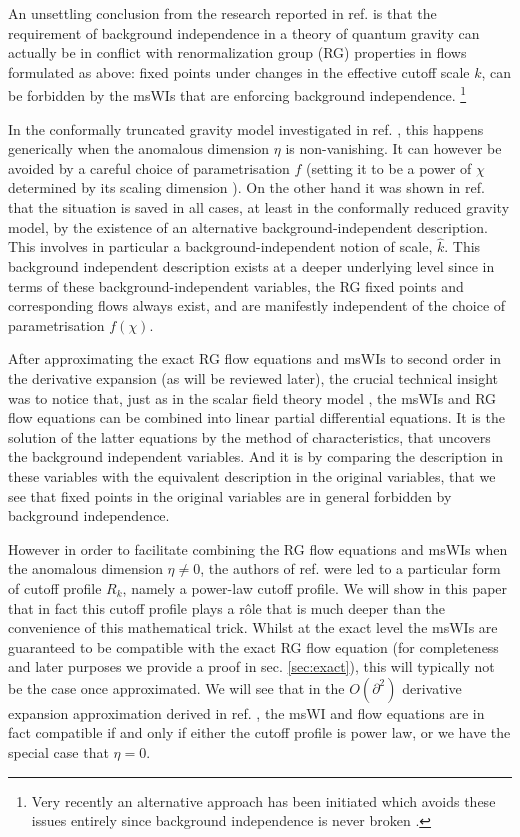 \documentclass[11pt]{book} %
\numberwithin{equation}{chapter}
\begin{document}
An unsettling conclusion from the research reported in ref. \cite{Dietz:2015owa} is that the
requirement of background independence in a theory of quantum gravity can actually be
in conflict with renormalization group (RG) properties in flows formulated as above:
fixed points under changes in the effective cutoff scale $k$, can be forbidden by the msWIs
that are enforcing background independence.%
\footnote{Very recently an alternative approach has been initiated which avoids
these issues entirely since background independence is never broken \cite{Morris:2016nda}.}

In the conformally truncated gravity model investigated in ref. \cite{Dietz:2015owa},
this happens generically when the anomalous dimension $\eta$ is non-vanishing.
It can however be avoided by a careful choice of parametrisation $f$
(setting it to be a power of $\chi$ determined by its scaling dimension \cite{Dietz:2015owa}).
On the other hand it was shown in ref. \cite{Dietz:2015owa} that the situation is saved in all cases,
at least in the conformally reduced gravity model,
by the existence of an alternative background-independent description.
This involves in particular a background-independent notion of scale, $\hat{k}$.
This background independent description exists at a deeper underlying level since in terms
of these background-independent variables, the RG fixed points and corresponding flows always exist,
and are manifestly independent of the choice of parametrisation $f(\chi)$.

After approximating the exact RG flow equations and msWIs to second order in the derivative
expansion (as will be reviewed later),
the crucial technical insight was to notice that, just as in the scalar field theory model
\cite{Bridle:2013sra}, the msWIs and RG flow equations can be combined into linear partial
differential equations. It is the solution of the latter equations by the method of characteristics,
that uncovers the background independent variables.
And it is by comparing the description in these variables with the equivalent description
in the original variables, that we see that fixed points in the original variables are
in general forbidden by  background independence.

However in order to facilitate combining the RG flow equations and msWIs when the anomalous
dimension $\eta\ne0$, the authors of ref. \cite{Dietz:2015owa} were led to a particular form
of cutoff profile $R_k$, namely a power-law cutoff profile.
We will show in this paper that in fact this cutoff profile plays a r\^ole that is much
deeper than the convenience of this mathematical trick.
Whilst at the exact level the msWIs are guaranteed to be compatible with the exact RG
flow equation (for completeness and later purposes we provide a proof in sec. \ref{sec:exact}),
this will typically not be the case once approximated.
We will see that in the $O(\partial^2)$ derivative expansion approximation derived
in ref. \cite{Dietz:2015owa},
the msWI and flow equations are in fact compatible {if and only if} either the cutoff profile
is power law, or we have the special case that $\eta=0$.
\end{document}
